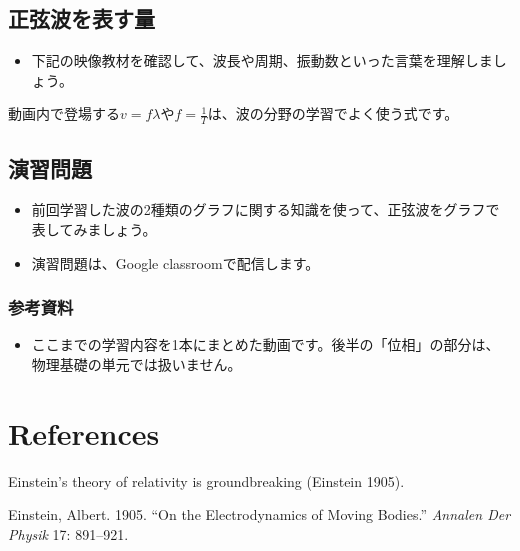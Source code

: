 \documentclass[
  letterpaper,
]{bxjsbook}
\providecommand{\tightlist}{%
  \setlength{\itemsep}{0pt}\setlength{\parskip}{0pt}}\usepackage{longtable,booktabs,array}
\newlength{\cslhangindent}
\newenvironment{CSLReferences}[2] %
 {\begin{list}{}{%
  \setlength{\itemindent}{0pt}
  \setlength{\leftmargin}{0pt}
  \setlength{\parsep}{0pt}
  \ifodd #1
   \setlength{\leftmargin}{\cslhangindent}
   \setlength{\itemindent}{-1\cslhangindent}
  \fi
  \setlength{\itemsep}{#2\baselineskip}}}
 {\end{list}}
\begin{document}
\section{正弦波を表す量}\label{ux6b63ux5f26ux6ce2ux3092ux8868ux3059ux91cf}

\begin{itemize}
\tightlist
\item
  下記の映像教材を確認して、波長や周期、振動数といった言葉を理解しましょう。
\end{itemize}

動画内で登場する\(v=f\lambda\)や\(f=\frac{1}{T}\)は、波の分野の学習でよく使う式です。

\section{演習問題}\label{ux6f14ux7fd2ux554fux984c}

\begin{itemize}
\tightlist
\item
  前回学習した波の2種類のグラフに関する知識を使って、正弦波をグラフで表してみましょう。
\item
  演習問題は、Google classroomで配信します。
\end{itemize}

\subsection{参考資料}\label{ux53c2ux8003ux8cc7ux6599}

\begin{itemize}
\tightlist
\item
  ここまでの学習内容を1本にまとめた動画です。後半の「位相」の部分は、物理基礎の単元では扱いません。
\end{itemize}


\chapter{References}\label{references}

Einstein's theory of relativity is groundbreaking (Einstein 1905).

\label{refs}
\begin{CSLReferences}{1}{0}
Einstein, Albert. 1905. {``On the Electrodynamics of Moving Bodies.''}
\emph{Annalen Der Physik} 17: 891--921.

\end{CSLReferences}
\end{document}
